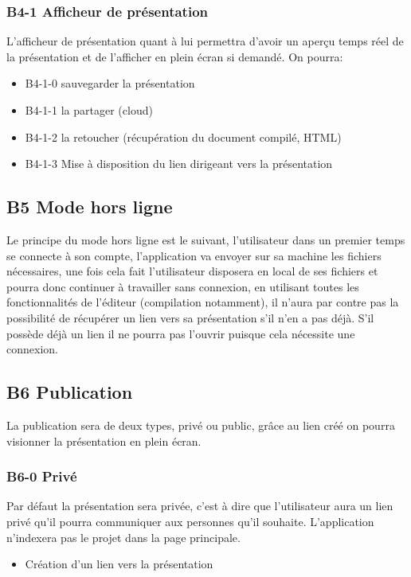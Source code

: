 \documentclass[11pt,a4paper]{article}
\begin{document}
\subsubsection{B4-1 Afficheur de présentation}
L'afficheur de présentation quant à lui permettra d'avoir un aperçu temps réel de la présentation et de l'afficher en plein écran si demandé. On pourra:
\begin{itemize}
\item B4-1-0 sauvegarder la présentation
\item B4-1-1 la partager (cloud)
\item B4-1-2 la retoucher (récupération du document compilé, HTML)
\item B4-1-3 Mise à disposition du lien dirigeant vers la présentation
\end{itemize} 

\subsection{B5 Mode hors ligne}
Le principe du mode hors ligne est le suivant, l'utilisateur dans un premier temps se connecte à son compte, l'application va envoyer sur sa machine les fichiers nécessaires, une fois cela fait l'utilisateur disposera en local de ses fichiers et pourra donc continuer à travailler sans connexion, en utilisant toutes les fonctionnalités de l'éditeur (compilation notamment), il n'aura par contre pas la possibilité de récupérer un lien vers sa présentation s'il n'en a pas déjà. S'il possède déjà un lien il ne pourra pas l'ouvrir puisque cela nécessite une connexion.

\subsection{B6 Publication}
La publication sera de deux types, privé ou public, grâce au lien créé on pourra visionner la présentation en plein écran.

\subsubsection{B6-0 Privé}
Par défaut la présentation sera privée, c'est à dire que l'utilisateur aura un lien privé qu'il pourra communiquer aux personnes qu'il souhaite. L'application n'indexera pas le projet dans la page principale.
\begin{itemize}
\item Création d'un lien vers la présentation
\end{itemize}
\end{document}
